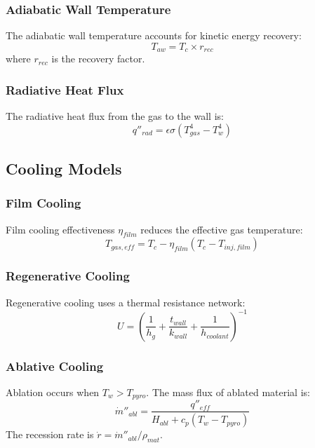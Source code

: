 \subsubsection{Adiabatic Wall Temperature}
The adiabatic wall temperature accounts for kinetic energy recovery:
\begin{equation}
T_{aw} = T_c \times r_{rec}
\end{equation}
where \(r_{rec}\) is the recovery factor.

\subsubsection{Radiative Heat Flux}
The radiative heat flux from the gas to the wall is:
\begin{equation}
q''_{rad} = \epsilon \sigma (T_{gas}^4 - T_w^4)
\end{equation}

\subsection{Cooling Models}

\subsubsection{Film Cooling}
Film cooling effectiveness \(\eta_{film}\) reduces the effective gas temperature:
\begin{equation}
T_{gas,eff} = T_c - \eta_{film} (T_c - T_{inj,film})
\end{equation}

\subsubsection{Regenerative Cooling}
Regenerative cooling uses a thermal resistance network:
\begin{equation}
U = \left( \frac{1}{h_g} + \frac{t_{wall}}{k_{wall}} + \frac{1}{h_{coolant}} \right)^{-1}
\end{equation}

\subsubsection{Ablative Cooling}
Ablation occurs when \(T_w > T_{pyro}\). The mass flux of ablated material is:
\begin{equation}
\dot{m}''_{abl} = \frac{q''_{eff}}{H_{abl} + c_p (T_w - T_{pyro})}
\end{equation}
The recession rate is \(\dot{r} = \dot{m}''_{abl} / \rho_{mat}\).

